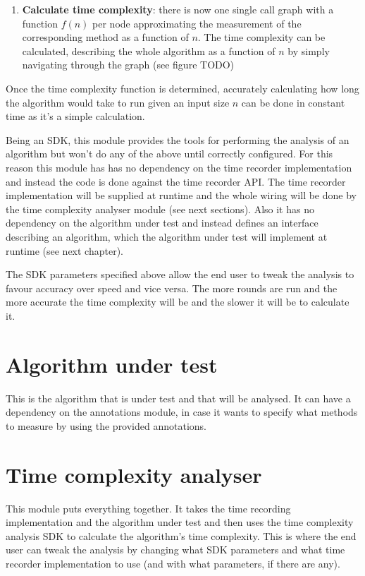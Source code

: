 \begin{enumerate}
  \item \textbf{Calculate time complexity}: there is now one single call graph with a function $f(n)$ per node approximating the measurement of the corresponding method as a function of $n$. The time complexity can be calculated, describing the whole algorithm as a function of $n$ by simply navigating through the graph (see figure TODO)
\end{enumerate}

\noindent Once the time complexity function is determined, accurately calculating how long the algorithm would take to run given an input size $n$ can be done in constant time as it's a simple calculation.

\noindent Being an SDK, this module provides the tools for performing the analysis of an algorithm but won't do any of the above until correctly configured. For this reason this module has  has no dependency on the time recorder implementation and instead the code is done against the time recorder API. The time recorder implementation will be supplied at runtime and the whole wiring will be done by the time complexity analyser module (see next sections). Also it has no dependency on the algorithm under test and instead defines an interface describing an algorithm, which the algorithm under test will implement at runtime (see next chapter).

\noindent The SDK parameters specified above allow the end user to tweak the analysis to favour accuracy over speed and vice versa. The more rounds are run and the more accurate the time complexity will be and the slower it will be to calculate it.

\section{Algorithm under test}
This is the algorithm that is under test and that will be analysed. It can have a dependency on the annotations module, in case it wants to specify what methods to measure by using the provided annotations.

\section{Time complexity analyser}
This module puts everything together. It takes the time recording implementation and the algorithm under test and then uses the time complexity analysis SDK to calculate the algorithm's time complexity. This is where the end user can tweak the analysis by changing what SDK parameters and what time recorder implementation to use (and with what parameters, if there are any).